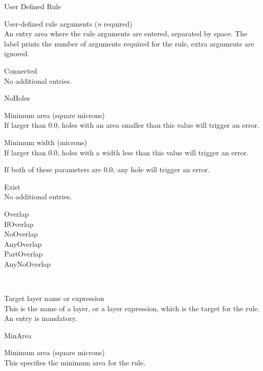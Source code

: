 \begin{description}
\item{\vt User Defined Rule}\\
\begin{description}
\item{\cb User-defined rule arguments ({\it n} required)}\\
An entry area where the rule arguments are entered, separated by
space.  The label prints the number of arguments required for the
rule, extra arguments are ignored.
\end{description}

\item{\vt Connected}\\
No additional entries.

\item{\vt NoHoles}\\
\begin{description}
\item{\cb Minimum area (square microns)}\\
If larger than 0.0, holes with an area smaller than this value will
trigger an error.

\item{\cb Minimum width (microns)}\\
If larger than 0.0, holes with a width less than this value will
trigger an error.
\end{description}
If both of these parameters are 0.0, any hole will trigger an error.

\item{\vt Exist}\\
No additional entries.

\item{\vt \parbox{1in}{Overlap\\
IfOverlap\\
NoOverlap\\
AnyOverlap\\
PartOverlap\\
AnyNoOverlap}}\\
\begin{description}
\item{\cb Target layer name or expression}\\
This is the name of a layer, or a layer expression, which is the
target for the rule.  An entry is mandatory.
\end{description}

\item{\vt MinArea}\\
\begin{description}
\item{\cb Minimum area (square microns)}\\
This specifies the minimum area for the rule.
\end{description}


\end{description}
